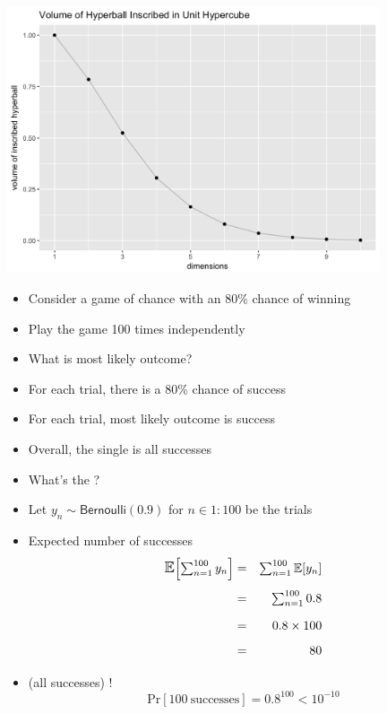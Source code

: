\documentclass[10pt]{report}
\begin{document}
%
\\
\spc
\includegraphics[width=0.825\textwidth]{img/volume-hyperball.png}






%
\begin{itemize}
\item Consider a game of chance with an 80\% chance of winning
\item Play the game 100 times independently
\vfill
\item What is most likely outcome?
\end{itemize}

%
\begin{itemize}
\item For each trial, there is a 80\% chance of success
\item For each trial, most likely outcome is success
\item Overall, the single  is all successes
\vfill
\item What's the ?
\end{itemize}

%
\begin{itemize}
\item Let $y_n \sim \mathsf{Bernoulli}(0.9)$ for $n \in 1:100$ be the trials
\item Expected number of successes
\begin{eqnarray*}
\textstyle
\mbox{\large $\mathbb{E}$}\!\left[ \sum_{n=1}^{100} y_n \right]
& = & \textstyle \sum_{n = 1}^{100} \mathbb{\large E}\!\left[ y_n \right]
\\[4pt]
& = & \textstyle \sum_{n=1}^{100} 0.8
\\[4pt]
& = & 0.8 \times 100
\\[2pt]
& = & 80
\end{eqnarray*}
\item {} (all successes) !
\[
\mbox{Pr}[100 \ \mbox{successes}] = 0.8^{100} < 10^{-10}
\]
\end{itemize}
\end{document}
